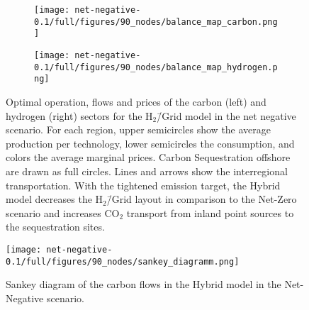 \documentclass[twocolumn]{article}
\newcommand{\carbon}{CO$_2$}
\newcommand{\hydrogengrid}{H$_2$\=/Grid}
\newcommand{\hydrogenmodel}{H$_2$\=/Grid model}
\newcommand{\hybridmodel}{Hybrid model}
\begin{document}
\begin{figure}[ht!]
    \centering
    \begin{subfigure}{.5\textwidth}
        \centering
        \texttt{[image: net-negative-0.1/full/figures/90\_nodes/balance\_map\_carbon.png]}
        \label{fig:balance_map_carbon_full_nn}
    \end{subfigure}%
    \begin{subfigure}{.5\textwidth}
        \centering
        \texttt{[image: net-negative-0.1/full/figures/90\_nodes/balance\_map\_hydrogen.png]}
        \label{fig:balance_map_hydrogen_full_nn}
    \end{subfigure}
    \caption{Optimal operation, flows and prices of the carbon (left) and hydrogen (right) sectors for the \hydrogenmodel{} in the net negative scenario. For each region, upper semicircles show the average production per technology, lower semicircles the consumption, and colors the average marginal prices. Carbon Sequestration offshore are drawn as full circles. Lines and arrows show the interregional transportation. With the tightened emission target, the \hybridmodel{} decreases the \hydrogengrid{} layout in comparison to the Net-Zero scenario and increases \carbon{} transport from inland point sources to the sequestration sites.
    }
    \label{fig:balance_maps_full_nn}
\end{figure}


\begin{figure}
    \centering
    \texttt{[image: net-negative-0.1/full/figures/90\_nodes/sankey\_diagramm.png]}
    \caption{Sankey diagram of the carbon flows in the \hybridmodel{} in the Net-Negative scenario.}
    \label{fig:sankey_diagramm}
\end{figure}
\end{document}
